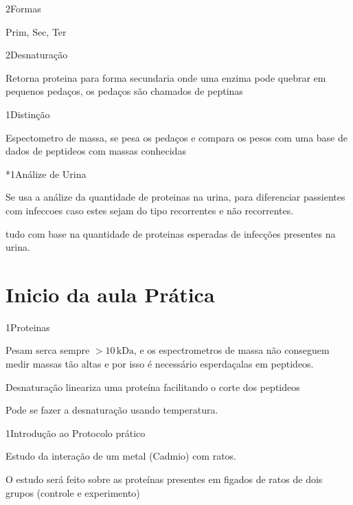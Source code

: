 \documentclass[\mainfilename]{subfiles}
\begin{document}
\begin{sectionBox}2{Formas}
    
    Prim, Sec, Ter
    
\end{sectionBox}

\begin{sectionBox}2{Desnaturação}
    
    Retorna proteina para forma secundaria onde uma enzima pode quebrar em pequenos pedaços, os pedaços são chamados de peptinas
    
\end{sectionBox}

\begin{sectionBox}1{Distinção}
    
    Espectometro de massa, se pesa os pedaços e compara os pesos com uma base de dados de peptideos com massas conhecidas
    
\end{sectionBox}

\begin{questionBox}*1{Análize de Urina}
    
    Se usa a análize da quantidade de proteinas na urina, para diferenciar passientes com infeccoes caso estes sejam do tipo recorrentes e não recorrentes.

    tudo com base na quantidade de proteinas esperadas de infecções presentes na urina.
    
\end{questionBox}

\part*{Inicio da aula Prática}

\begin{sectionBox}1{Proteinas}
    
    Pesam serca sempre \(>10\,\unit{\kilo\dalton}\), e os espectrometros de massa não conseguem medir massas tão altas e por isso é necessário esperdaçalas em peptideos.

    Desnaturação lineariza uma proteína facilitando o corte dos peptideos

    Pode se fazer a desnaturação usando temperatura.
    
\end{sectionBox}

\begin{sectionBox}1{Introdução ao Protocolo prático}
    
    Estudo da interação de um metal (Cadmio) com ratos.

    O estudo será feito sobre as proteínas presentes em figados de ratos de dois grupos (controle e experimento)
    
\end{sectionBox}
\end{document}
